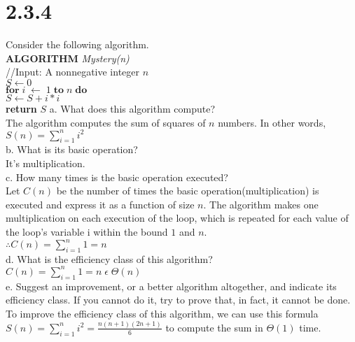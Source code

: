 \documentclass[8pt, letterpaper]{article}
\begin{document}
\section{2.3.4}
Consider the following algorithm.\\
\textbf{ALGORITHM} \textit{Mystery(n)} \\
\indent //Input: A nonnegative integer $n$ \\
\indent $S \leftarrow 0$ \\
\indent $\textbf{for}\; i \; \leftarrow \; 1 \; \textbf{to} \; n \; \textbf{do}$ \\
\indent \indent $S \leftarrow S + i * i$ \\
\indent \textbf{return} $S$ 
\newline
\indent a. What does this algorithm compute? \\
\indent \indent The algorithm computes the sum of squares of $n$ numbers. In other words, $S(n) = \sum\limits_{i=1}^n i^2$ \\
\indent b. What is its basic operation? \\
\indent \indent It's multiplication. \\
\indent c. How many times is the basic operation executed? \\
\indent \indent Let $C(n)$ be the number of times the basic operation(multiplication) is executed and express it as a function of size $n$. The algorithm makes one multiplication on each execution of the loop, which is repeated for each value of the loop's variable i within the bound $1$ and $n$. \\
\indent \indent $\mathrel{\therefore{} C(n)} = \sum\limits_{i=1}^n 1 = n$ \\ 
\indent d. What is the efficiency class of this algorithm? \\
\indent \indent $C(n) = \sum\limits_{i=1}^n 1 = n \; \epsilon \; \Theta(n)$\\
\indent e. Suggest an improvement, or a better algorithm altogether, and indicate its efficiency class. If you cannot do it, try to prove that, in fact, it cannot be done. \\
\indent \indent To improve the efficiency class of this algorithm, we can use this formula $S(n) = \sum\limits_{i=1}^n i^2 = \frac{n(n+1)(2n+1)}{6}$ to compute the sum in $\Theta(1)$ time.
\end{document}
